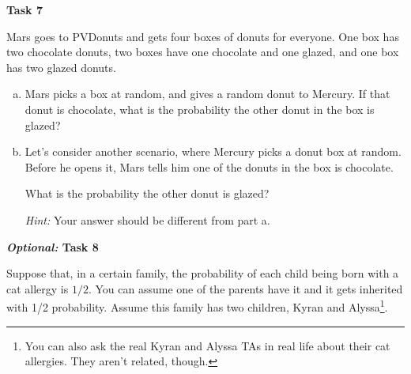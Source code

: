 \documentclass[12pt,letterpaper]{article}
\newenvironment{22enumerate}{\begin{enumerate}[a.]\itemsep0em}{\end{enumerate}}
\newif\ifsol
\newcommand{\solu}[2]{ \begin{mdframed} \ifsol #2 \else \vspace{#1} \fi \end{mdframed} }
\begin{document}
\newpage

\textbf{Task 7}

Mars goes to PVDonuts and gets four boxes of donuts for everyone. One box has two chocolate donuts, two boxes have one chocolate and one glazed, and one box has two glazed donuts.

\begin{22enumerate}
\item Mars picks a box at random, and gives a random donut to Mercury. If that donut is chocolate, what is the probability the other donut in the box is glazed?
\solu{3cm}{Let $G$ be the event that the other donut is glazed, and $C$ be the event that Mars chooses a chocolate donut. We want to find $\Pr(G|C)=\Pr(G\cap C)/\Pr(C)$.

$G\cap C$ is just the event that Mars picks a box with a chocolate and glazed donut $(\frac{2}{4})$ \textit{and} Mars picks the chocolate donut first ($\frac12$), for a total probability of $\frac14$.

$C$ is the probability that Mars picked a chocolate donut, which is $\frac12$. This is because there are four chocolate donuts and four glazed donuts in total to pick from in the equally likely boxes, so there's a $\frac12$ that a chocolate donut is picked by Mars.

So, the total probability is \[\Pr(G|C)=\frac{\left(\frac14\right)}{\left(\frac12\right)}=\frac12\].
}

\item Let's consider another scenario, where Mercury picks a donut box at random. Before he opens it, Mars tells him one of the donuts in the box is chocolate.

What is the probability the other donut is glazed?

\textit{Hint:} Your answer should be different from part a.

\solu{3cm}{Let $G$ be the event that the other donut is glazed, and $C$ be the event that Mercury chooses a box with at least one chocolate donut.

$G \cap C$ is the event where Mercury chooses one of the chocolate/glazed boxes, for a $\frac12$ chance.
$C$ is the event where Mercury chooses any box with chocolate inside, with probability $\frac{3}{4}$.

So, $\Pr(G | C) = \frac{\frac12}{\frac34}=2/3$.
}
\end{22enumerate}

\newpage
\textbf{\textit{Optional: }Task 8}

Suppose that, in a certain family, the probability of each child being born with a cat allergy is $1/2$. You can assume one of the parents have it and it gets inherited with 1/2 probability. Assume this family has two children, Kyran and Alyssa\footnote{You can also ask the real Kyran and Alyssa TAs in real life about their cat allergies. They aren't related, though.}. 
\end{document}
